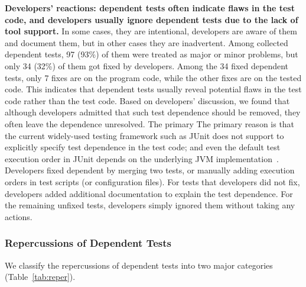 \vspace{1mm}
\noindent \textbf{{Developers' reactions: dependent tests
often indicate flaws in the test code, and developers usually
ignore dependent tests due to the lack of tool support.}}
In some cases, they are intentional, developers are aware
of them and document them, but in other cases they are
inadvertent. Among \dtnum collected dependent tests,
97 (93\%) of them were treated as major or minor problems,
but only 34 (32\%) of them got fixed by developers. Among
the 34 fixed dependent tests, only 7 fixes are
on the program code, while the other fixes are on the
tested code. This indicates that dependent tests usually
reveal potential flaws in the test code rather than the test code.
Based on developers' discussion, we found that although
developers admitted that such test dependence should be removed,
they often leave the dependence unresolved. The primary
The primary reason is that the current widely-used testing
framework such as JUnit does not support to explicitly specify
test dependence in the test code; and even the default test
execution order in JUnit depends on the
underlying JVM implementation~\cite{junitordering}.
Developers fixed dependent by merging two tests,
or manually adding execution orders in test
scripts (or configuration files).
For  tests that developers did not fix,
developers added additional documentation to
explain the test dependence.
For the remaining  unfixed tests,
developers simply ignored them without taking any
actions.






\subsubsection{Repercussions of Dependent Tests}
\label{sec:repercussion}



We classify the repercussions of dependent tests
into two major categories (Table~\ref{tab:reper}).

\vspace{1mm}

